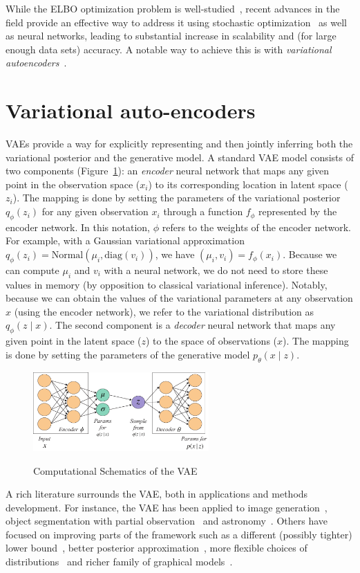 While the ELBO optimization problem is well-studied~\cite{Blei2017}, recent advances in the field provide an effective way to address it using stochastic optimization~\cite{Hoffman2013} as well as neural networks, leading to substantial increase in scalability and (for large enough data sets) accuracy. 
A notable way to achieve this is with \textit{variational autoencoders}~\cite{Kingma2014,Rezende2014}.

\section{Variational auto-encoders}\label{box:VAE}
VAEs provide a way for explicitly representing and then jointly inferring both the variational posterior and the generative model.  A standard VAE model consists of two components (Figure~\ref{vae_fig}): an \textit{encoder} neural network that maps any given point in the observation space ($x_i$) to its corresponding location in latent space ($z_i$). The mapping is done by setting the parameters of the variational posterior $q_{\phi}(z_i)$ for any given observation $x_i$ through a function $f_\phi$ represented by the encoder network. In this notation, $\phi$ refers to the weights of the encoder network. For example, with a Gaussian variational approximation $q_{\phi}(z_i) = \textrm{Normal}\left(\mu_i, \textrm{diag}(v_i)\right)$, we have $(\mu_i, v_i) = f_\phi(x_i)$. Because we can compute $\mu_i$ and $v_i$ with a neural network, we do not need to store these values in memory (by opposition to classical variational inference). Notably, because we can obtain the values of the variational parameters at any observation $x$ (using the encoder network), we refer to the variational distribution as $q_\phi(z \mid x)$. The second component is a \textit{decoder} neural network that maps any given point in the latent space ($z$) to the space of observations ($x$). The mapping is done by setting the parameters of the generative model $p_{\theta}(x \mid z)$. 
\begin{figure}\centering
    \includegraphics[width=0.6\textwidth]{review/figures/vae.pdf}\\
      \caption{\label{vae_fig}Computational Schematics of the VAE}
\end{figure}
      
A rich literature surrounds the VAE, both in applications and methods development. For instance, the VAE has been applied to image generation~\cite{Gregor2015}, object segmentation with partial observation~\cite{Sohn2015} and astronomy~\cite{AAAI1714765}. Others have focused on improving parts of the framework such as a different (possibly tighter) lower bound~\cite{Li2016,Burda2016}, better posterior approximation~\cite{Kingma2016a}, more flexible choices of distributions~\cite{Ruiz2016} and richer family of graphical models~\cite{NIPS2016_6379}.


